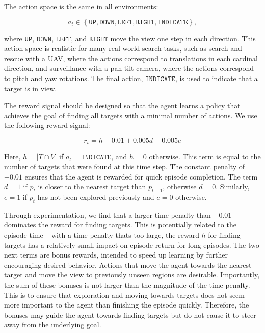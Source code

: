 The action space is the same in all environments:

\begin{equation}
    a_t \in \left\lbrace \mathtt{UP}, \mathtt{DOWN}, \mathtt{LEFT}, \mathtt{RIGHT}, \mathtt{INDICATE} \right\rbrace,
\end{equation}

where \(\mathtt{UP}\), \(\mathtt{DOWN}\), \(\mathtt{LEFT}\), and \(\mathtt{RIGHT}\) move the view one step in each direction.
This action space is realistic for many real-world search tasks,
such as search and rescue with a UAV, where the actions correspond to translations in each cardinal direction,
and surveillance with a pan-tilt-camera, where the actions correspond to pitch and yaw rotations.
The final action, \(\mathtt{INDICATE}\), is used to indicate that a target is in view.

The reward signal should be designed so that the agent learns a policy that achieves the goal of finding all targets with a minimal number of actions.
We use the following reward signal:

\begin{equation}
    r_t = h - 0.01 + 0.005d + 0.005e
\end{equation}

Here, \(h = \left\lvert T \cap V \right\rvert\) if \(a_t = \mathtt{INDICATE}\), and \(h = 0\) otherwise.
This term is equal to the number of targets that were found at this time step.
The constant penalty of \(-0.01\) ensures that the agent is rewarded for quick episode completion.
The term \(d = 1\) if \(p_t\) is closer to the nearest target than \(p_{t-1}\), otherwise \(d = 0\).
Similarly, \(e = 1\) if \(p_t\) has not been explored previously and \(e = 0\) otherwise.

Through experimentation, we find that a larger time penalty than \(-0.01\) dominates the reward for finding targets.
This is potentially related to the episode time -- with a time penalty thats too large, the reward \(h\) for finding targets has a relatively small impact on episode return for long episodes.
The two next terms are bonus rewards, intended to speed up learning by further encouraging desired behavior.
Actions that move the agent towards the nearest target and move the view to previously unseen regions are desirable.
Importantly, the sum of these bonuses is not larger than the magnitude of the time penalty.
This is to ensure that exploration and moving towards targets does not seem more important to the agent than finishing the episode quickly.
Therefore, the bonuses may guide the agent towards finding targets but do not cause it to steer away from the underlying goal.

